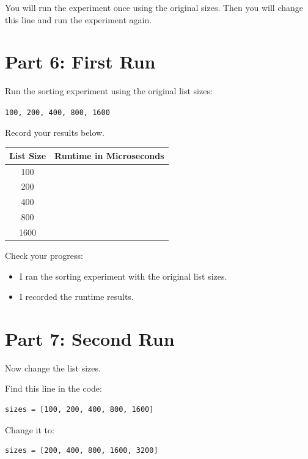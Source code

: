 \documentclass[11pt]{article}
\newcommand{\checkbox}{$\square$}
\begin{document}
You will run the experiment once using the original sizes. Then you will change this line and run the experiment again.

\section*{Part 6: First Run}

Run the sorting experiment using the original list sizes:

\begin{center}
\texttt{100, 200, 400, 800, 1600}
\end{center}

Record your results below.

\begin{center}
\begin{tabular}{|c|c|}
\hline
\textbf{List Size} & \textbf{Runtime in Microseconds} \\
\hline
100 & \\
\hline
200 & \\
\hline
400 & \\
\hline
800 & \\
\hline
1600 & \\
\hline
\end{tabular}
\end{center}

\noindent Check your progress:

\begin{itemize}
    \item[\checkbox] I ran the sorting experiment with the original list sizes.
    \item[\checkbox] I recorded the runtime results.
\end{itemize}

\section*{Part 7: Second Run}

Now change the list sizes.

Find this line in the code:

\begin{lstlisting}[style=pythonstyle]
sizes = [100, 200, 400, 800, 1600]
\end{lstlisting}

Change it to:

\begin{lstlisting}[style=pythonstyle]
sizes = [200, 400, 800, 1600, 3200]
\end{lstlisting}
\end{document}
